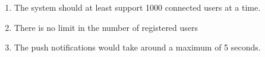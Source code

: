 \begin{enumerate}
\item The system should at least support 1000 connected users at a time.
\item There is no limit in the number of registered users
\item The push notifications would take around a maximum of 5 seconds.
\end{enumerate}